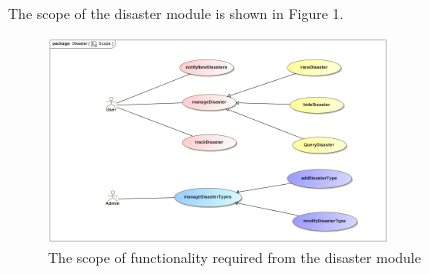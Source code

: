 The scope of the disaster module is shown in Figure 1.

\begin{figure}[ht!]
\centering
\includegraphics[width=90mm]{../images/Scope.jpg}
\caption{The scope of functionality required from the disaster module \label{overflow}}
\end{figure}